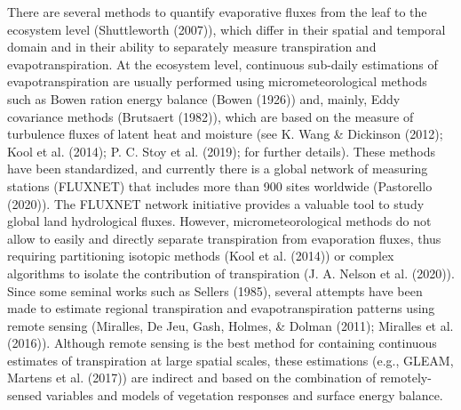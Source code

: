 \documentclass[11pt,twoside]{reedthesis}
\begin{document}
There are several methods to quantify evaporative fluxes from the leaf
to the ecosystem level (Shuttleworth (2007)), which differ in their
spatial and temporal domain and in their ability to separately measure
transpiration and evapotranspiration. At the ecosystem level, continuous
sub-daily estimations of evapotranspiration are usually performed using
micrometeorological methods such as Bowen ration energy balance (Bowen
(1926)) and, mainly, Eddy covariance methods (Brutsaert (1982)), which
are based on the measure of turbulence fluxes of latent heat and
moisture (see K. Wang \& Dickinson (2012); Kool et al. (2014); P. C.
Stoy et al. (2019); for further details). These methods have been
standardized, and currently there is a global network of measuring
stations (FLUXNET) that includes more than 900 sites worldwide
(Pastorello (2020)). The FLUXNET network initiative provides a valuable
tool to study global land hydrological fluxes. However,
micrometeorological methods do not allow to easily and directly separate
transpiration from evaporation fluxes, thus requiring partitioning
isotopic methods (Kool et al. (2014)) or complex algorithms to isolate
the contribution of transpiration (J. A. Nelson et al. (2020)). Since
some seminal works such as Sellers (1985), several attempts have been
made to estimate regional transpiration and evapotranspiration patterns
using remote sensing (Miralles, De Jeu, Gash, Holmes, \& Dolman (2011);
Miralles et al. (2016)). Although remote sensing is the best method for
containing continuous estimates of transpiration at large spatial
scales, these estimations (e.g., GLEAM, Martens et al. (2017)) are
indirect and based on the combination of remotely-sensed variables and
models of vegetation responses and surface energy balance.\par
\end{document}
